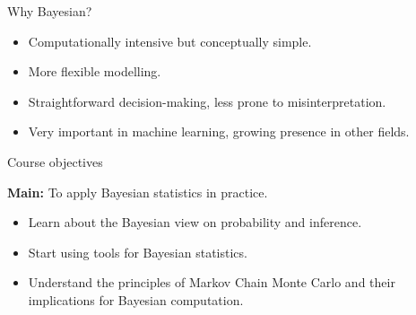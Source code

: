 

\begin{frame}{Why Bayesian?}

\begin{itemize}\itemsep1.2em

\item Computationally intensive but conceptually simple.

\item More flexible modelling.

\item Straightforward decision-making, less prone to misinterpretation.

\item Very important in machine learning, growing presence in other fields.

\end{itemize}
\end{frame}


\begin{frame}{Course objectives}

\begin{LARGE}
\textbf{Main:} To apply Bayesian statistics in practice.
\end{LARGE}

\bigskip

\begin{itemize}\itemsep1.2em

\item Learn about the Bayesian view on probability and inference.

\item Start using tools for Bayesian statistics.

\item Understand the principles of Markov Chain Monte Carlo and their implications for Bayesian computation.

\end{itemize}

\bigskip

\end{frame}

